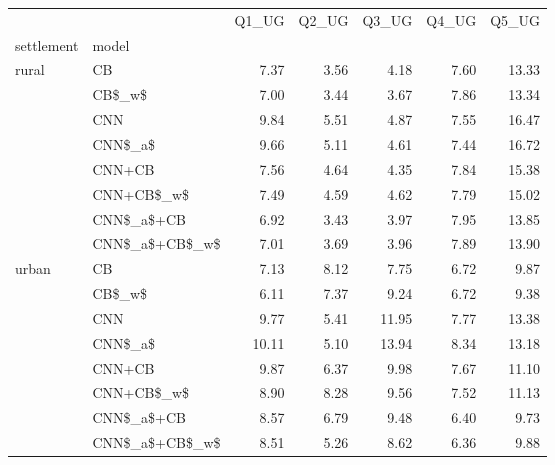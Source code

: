 \begin{tabular}{llrrrrr}
\toprule
      &                &  Q1\_UG &  Q2\_UG &  Q3\_UG &  Q4\_UG &  Q5\_UG \\
settlement & model &        &        &        &        &        \\
\midrule
rural & CB &   7.37 &   3.56 &   4.18 &   7.60 &  13.33 \\
      & CB\$\_w\$ &   7.00 &   3.44 &   3.67 &   7.86 &  13.34 \\
      & CNN &   9.84 &   5.51 &   4.87 &   7.55 &  16.47 \\
      & CNN\$\_a\$ &   9.66 &   5.11 &   4.61 &   7.44 &  16.72 \\
      & CNN+CB &   7.56 &   4.64 &   4.35 &   7.84 &  15.38 \\
      & CNN+CB\$\_w\$ &   7.49 &   4.59 &   4.62 &   7.79 &  15.02 \\
      & CNN\$\_a\$+CB &   6.92 &   3.43 &   3.97 &   7.95 &  13.85 \\
      & CNN\$\_a\$+CB\$\_w\$ &   7.01 &   3.69 &   3.96 &   7.89 &  13.90 \\
urban & CB &   7.13 &   8.12 &   7.75 &   6.72 &   9.87 \\
      & CB\$\_w\$ &   6.11 &   7.37 &   9.24 &   6.72 &   9.38 \\
      & CNN &   9.77 &   5.41 &  11.95 &   7.77 &  13.38 \\
      & CNN\$\_a\$ &  10.11 &   5.10 &  13.94 &   8.34 &  13.18 \\
      & CNN+CB &   9.87 &   6.37 &   9.98 &   7.67 &  11.10 \\
      & CNN+CB\$\_w\$ &   8.90 &   8.28 &   9.56 &   7.52 &  11.13 \\
      & CNN\$\_a\$+CB &   8.57 &   6.79 &   9.48 &   6.40 &   9.73 \\
      & CNN\$\_a\$+CB\$\_w\$ &   8.51 &   5.26 &   8.62 &   6.36 &   9.88 \\
\bottomrule
\end{tabular}
